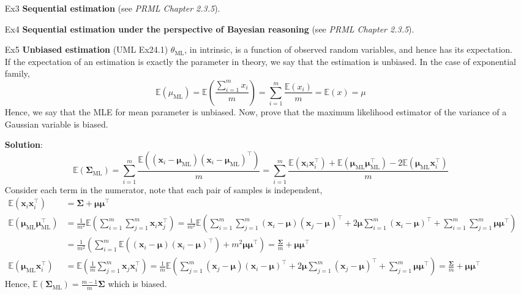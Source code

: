 \documentclass{article}
\begin{document}
\begin{itemize}
\item[Ex3] \textbf{Sequential estimation} (see \textit{PRML Chapter 2.3.5}).

\item[Ex4] \textbf{Sequential estimation under the perspective of Bayesian reasoning} (see \textit{PRML Chapter 2.3.5}).

\item[Ex5] \textbf{Unbiased estimation} (UML Ex24.1) $\theta_{\mathrm{ML}}$, in intrinsic, is a function of observed random variables, and hence has its expectation. If the expectation of an estimation is exactly the parameter in theory, we say that the estimation is unbiased. In the case of exponential family, 
	\begin{equation*} 
	\mathbb{E} (\mu_\mathrm{ML}) = \mathbb{E} \left(\frac{\sum_{i=1}^m x_i}{m}\right) =  \sum_{i=1}^m  \frac{\mathbb{E}(x_i)}{m} = \mathbb{E}(x) = \mu
	\end{equation*}
Hence, we say that the MLE for mean parameter is unbiased. Now, prove that the maximum likelihood estimator of the variance of a Gaussian variable is biased.

\item[] \textbf{Solution}:
	\begin{equation*}
	\mathbb{E} (\bm{\Sigma}_\mathrm{ML}) = \sum_{i=1}^m  \frac{\mathbb{E}((\bm{x}_i - \bm{\mu}_\mathrm{ML})(\bm{x}_i - \bm{\mu}_\mathrm{ML})^\top)}{m}
	= \sum_{i=1}^m  \frac{\mathbb{E}(\bm{x}_i \bm{x}_i^\top) + \mathbb{E}(\bm{\mu}_\mathrm{ML} \bm{\mu}_\mathrm{ML}^\top) - 2\mathbb{E}(\bm{\mu}_\mathrm{ML} \bm{x}_i^\top)}{m}
	\end{equation*}
	Consider each term in the numerator, note that each pair of samples is independent,
	\begin{equation*}
	\begin{split}
	\mathbb{E}(\bm{x}_i \bm{x}_i^\top) &= \bm{\Sigma} + \bm{\mu}\bm{\mu}^\top  \\
	\mathbb{E}(\bm{\mu}_\mathrm{ML} \bm{\mu}_\mathrm{ML}^\top) &= 
	\frac{1}{m^2} \mathbb{E}\left(\sum_{i=1}^m \sum_{j=1}^m \bm{x}_i \bm{x}_j^\top\right) 
	= \frac{1}{m^2} \mathbb{E}\left(\sum_{i=1}^m \sum_{j=1}^m (\bm{x}_i-\bm{\mu}) (\bm{x}_j-\bm{\mu})^\top + 2\bm{\mu} \sum_{i=1}^m (\bm{x}_i-\bm{\mu})^\top + \sum_{i=1}^m\sum_{j=1}^m \bm{\mu}\bm{\mu}^\top \right) \\
	&= \frac{1}{m^2} \left( \sum_{i=1}^m \mathbb{E}((\bm{x}_i-\bm{\mu}) (\bm{x}_i-\bm{\mu})^\top)+ m^2 \bm{\mu}\bm{\mu}^\top \right)
	= \frac{\bm{\Sigma}}{m} + \bm{\mu}\bm{\mu}^\top \\
	\mathbb{E}(\bm{\mu}_\mathrm{ML} \bm{x}_i^\top) &=  \mathbb{E} \left(\frac{1}{m}\sum_{j=1}^m \bm{x}_j \bm{x}_i^\top \right)
	= \frac{1}{m} \mathbb{E} \left(\sum_{j=1}^m (\bm{x}_j-\bm{\mu})(\bm{x}_i-\bm{\mu})^\top + 2\bm{\mu}\sum_{j=1}^m (\bm{x}_j-\bm{\mu})^\top + \sum_{j=1}^m \bm{\mu} \bm{\mu}^\top\right) = \frac{\bm{\Sigma}}{m} + \bm{\mu} \bm{\mu}^\top
	\end{split}
	\end{equation*}
Hence, $\mathbb{E} (\bm{\Sigma}_\mathrm{ML}) = \frac{m-1}{m} \bm{\Sigma}$ which is biased.


\end{itemize}
\end{document}
